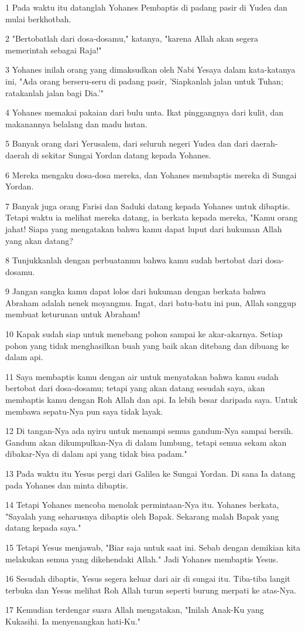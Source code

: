 \par 1 Pada waktu itu datanglah Yohanes Pembaptis di padang pasir di Yudea dan mulai berkhotbah.
\par 2 "Bertobatlah dari dosa-dosamu," katanya, "karena Allah akan segera memerintah sebagai Raja!"
\par 3 Yohanes inilah orang yang dimaksudkan oleh Nabi Yesaya dalam kata-katanya ini, "Ada orang berseru-seru di padang pasir, 'Siapkanlah jalan untuk Tuhan; ratakanlah jalan bagi Dia.'"
\par 4 Yohanes memakai pakaian dari bulu unta. Ikat pinggangnya dari kulit, dan makanannya belalang dan madu hutan.
\par 5 Banyak orang dari Yerusalem, dari seluruh negeri Yudea dan dari daerah-daerah di sekitar Sungai Yordan datang kepada Yohanes.
\par 6 Mereka mengaku dosa-dosa mereka, dan Yohanes membaptis mereka di Sungai Yordan.
\par 7 Banyak juga orang Farisi dan Saduki datang kepada Yohanes untuk dibaptis. Tetapi waktu ia melihat mereka datang, ia berkata kepada mereka, "Kamu orang jahat! Siapa yang mengatakan bahwa kamu dapat luput dari hukuman Allah yang akan datang?
\par 8 Tunjukkanlah dengan perbuatanmu bahwa kamu sudah bertobat dari dosa-dosamu.
\par 9 Jangan sangka kamu dapat lolos dari hukuman dengan berkata bahwa Abraham adalah nenek moyangmu. Ingat, dari batu-batu ini pun, Allah sanggup membuat keturunan untuk Abraham!
\par 10 Kapak sudah siap untuk menebang pohon sampai ke akar-akarnya. Setiap pohon yang tidak menghasilkan buah yang baik akan ditebang dan dibuang ke dalam api.
\par 11 Saya membaptis kamu dengan air untuk menyatakan bahwa kamu sudah bertobat dari dosa-dosamu; tetapi yang akan datang sesudah saya, akan membaptis kamu dengan Roh Allah dan api. Ia lebih besar daripada saya. Untuk membawa sepatu-Nya pun saya tidak layak.
\par 12 Di tangan-Nya ada nyiru untuk menampi semua gandum-Nya sampai bersih. Gandum akan dikumpulkan-Nya di dalam lumbung, tetapi semua sekam akan dibakar-Nya di dalam api yang tidak bisa padam."
\par 13 Pada waktu itu Yesus pergi dari Galilea ke Sungai Yordan. Di sana Ia datang pada Yohanes dan minta dibaptis.
\par 14 Tetapi Yohanes mencoba menolak permintaan-Nya itu. Yohanes berkata, "Sayalah yang seharusnya dibaptis oleh Bapak. Sekarang malah Bapak yang datang kepada saya."
\par 15 Tetapi Yesus menjawab, "Biar saja untuk saat ini. Sebab dengan demikian kita melakukan semua yang dikehendaki Allah." Jadi Yohanes membaptis Yesus.
\par 16 Sesudah dibaptis, Yesus segera keluar dari air di sungai itu. Tiba-tiba langit terbuka dan Yesus melihat Roh Allah turun seperti burung merpati ke atas-Nya.
\par 17 Kemudian terdengar suara Allah mengatakan, "Inilah Anak-Ku yang Kukasihi. Ia menyenangkan hati-Ku."

